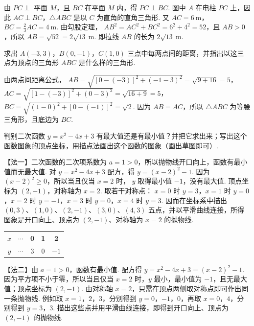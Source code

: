 \begin{solution}
由 \(PC\perp\) 平面 \(M\)，且 \(BC\) 在平面 \(M\) 内，得 \(PC\perp BC\). 图中 \(A\) 在电柱 \(PC\) 上，因此 \(AC\perp BC\)，\(\triangle ABC\) 是以 \(C\) 为直角的直角三角形. 又
\(AC=6\mathrm{~m}\)，\(BC=\frac23AC=4\mathrm{~m}\). 由勾股定理，
\(AB^2=AC^2+BC^2=6^2+4^2=52\)，且 \(AB>0\)，所以
\(AB=\sqrt{52}=2\sqrt{13}\mathrm{~m}\). 即拉线 \(AB\) 的长为 \(2\sqrt{13}\mathrm{~m}\).
\end{solution}

\begin{problem}
求出 \( A(-3,3) \)，\( B(0,-1) \)，\( C(1,0) \) 三点中每两点间的距离，并指出以这三点为顶点的三角形 \(ABC\) 是什么样的三角形.

\end{problem}

\begin{solution}
由两点间距离公式，
\(AB=\sqrt{[0-(-3)]^2+(-1-3)^2}=\sqrt{9+16}=5\)，
\(AC=\sqrt{[1-(-3)]^2+(0-3)^2}=\sqrt{16+9}=5\)，
\(BC=\sqrt{(1-0)^2+[0-(-1)]^2}=\sqrt2\). 因为 \(AB=AC\)，所以 \(\triangle ABC\) 为等腰三角形，且底边为 \(BC\).

\end{solution}

\begin{problem}
判别二次函数 \( y=x^2-4x+3 \) 有最大值还是有最小值？并把它求出来；写出这个函数图象的顶点坐标，用描点法画出这个函数的图象（画出草图即可）.
\end{problem}

\begin{solution}
【法一】二次函数的二次项系数为 \(a=1>0\)，所以抛物线开口向上，函数有最小值而无最大值. 对
\(y=x^2-4x+3\) 配方，得 \(y=(x-2)^2-1\). 因为 \((x-2)^2\geqslant0\)，所以当且仅当 \(x=2\) 时，
\(y\) 取得最小值 \(-1\)，没有最大值. 顶点坐标为 \((2,-1)\)，对称轴为 \(x=2\). 取若干对称点：
\(x=0\) 时 \(y=3\)，\(x=1\) 时 \(y=0\)，\(x=2\) 时 \(y=-1\)，\(x=3\) 时 \(y=0\)，\(x=4\) 时 \(y=3\). 因而在坐标系中描出
\((0,3)\)、\((1,0)\)、\((2,-1)\)、\((3,0)\)、\((4,3)\) 五点，并以平滑曲线连接，所得图象是开口向上、顶点为 \((2,-1)\)、对称轴为 \(x=2\) 的抛物线.

\begin{center}
\begin{tabular}{|c|c|c|c|c|}
\hline
\(x\) & \(\cdots\) & 0 & 1 & 2 \\
\hline
\(y\) & \(\cdots\) & 3 & 0 & \(-1\) \\
\hline
\end{tabular}
\end{center}


【法二】由 \(a=1>0\)，函数有最小值. 配方得
\(y=x^2-4x+3=(x-2)^2-1\). 因为平方项不小于零，所以当且仅当 \(x=2\) 时，\(y\) 最小，最小值为 \(-1\)，且无最大值；顶点坐标为 \((2,-1)\). 由对称轴 \(x=2\)，只需在顶点两侧取对称点即可作出同一条抛物线. 例如取 \(x=1\)，\(2\)，\(3\)，分别得到 \(y=0\)，\(-1\)，\(0\)，再取 \(x=0\)，\(4\)，分别得到 \(y=3\)，\(3\). 描出这些点并用平滑曲线连接，即得到开口向上、顶点为 \((2,-1)\) 的抛物线.

\end{solution}

